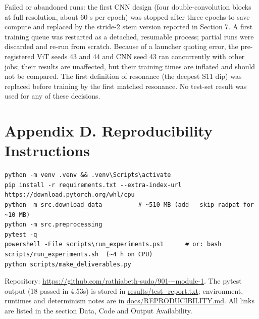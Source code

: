 \documentclass[11pt,a4paper]{article}
\begin{document}
Failed or abandoned runs: the first CNN design (four double-convolution blocks at full resolution, about 60 s per epoch) was stopped after three epochs to save compute and replaced by the stride-2 stem version reported in Section 7. A first training queue was restarted as a detached, resumable process; partial runs were discarded and re-run from scratch. Because of a launcher quoting error, the pre-registered ViT seeds 43 and 44 and CNN seed 43 ran concurrently with other jobs; their results are unaffected, but their training times are inflated and should not be compared. The first definition of resonance (the deepest S11 dip) was replaced before training by the first matched resonance. No test-set result was used for any of these decisions.

\section*{Appendix D. Reproducibility Instructions}
\begin{verbatim}
python -m venv .venv && .venv\Scripts\activate
pip install -r requirements.txt --extra-index-url https://download.pytorch.org/whl/cpu
python -m src.download_data          # ~510 MB (add --skip-radpat for ~10 MB)
python -m src.preprocessing
pytest -q
powershell -File scripts\run_experiments.ps1      # or: bash scripts/run_experiments.sh  (~4 h on CPU)
python scripts/make_deliverables.py
\end{verbatim}
Repository: \url{https://github.com/rathiabeth-sudo/901---module-1}. The pytest output (18 passed in 4.53s) is stored in \href{https://github.com/rathiabeth-sudo/901---module-1/blob/main/results/test_report.txt}{results/test\_report.txt}; environment, runtimes and determinism notes are in \href{https://github.com/rathiabeth-sudo/901---module-1/blob/main/docs/REPRODUCIBILITY.md}{docs/REPRODUCIBILITY.md}. All links are listed in the section Data, Code and Output Availability.
\end{document}
